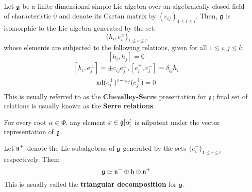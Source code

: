         \begin{theorem}
            Let $\mathfrak{g}$ be a finite-dimensional simple Lie algebra over an algebraically closed field of characteristic $0$ and denote its Cartan matrix by $(c_{ij})_{1 \leq i \leq l}$. Then, $\mathfrak{g}$ is isomorphic to the Lie algebra generated by the set:
                $$\{h_i, e_i^{\pm}\}_{1 \leq i \leq l}$$
            whose elements are subjected to the following relations, given for all $1 \leq i, j \leq l$:
                $$[h_i, h_j] = 0$$
                $$[h_i, e_j^{\pm}] = \pm c_{ij} e_j^{\pm}, [e_i^+, e_j^-] = \delta_{ij} h_i$$
                $$\mathrm{ad}(e_i^{\pm})^{1 - c_{ij}}(e_j^{\pm}) = 0$$
            This is usually referred to as the \textbf{Chevalley-Serre} presentation for $\mathfrak{g}$; final set of relations is usually known as the \textbf{Serre relations}.
        \end{theorem}
        \begin{corollary}
            For every root $\alpha \in \Phi$, any element $x \in \mathfrak{g}[\alpha]$ is nilpotent under the vector representation of $\mathfrak{g}$. 
        \end{corollary}
        \begin{corollary}
            Let $\mathfrak{n}^{\pm}$ denote the Lie subalgebras of $\mathfrak{g}$ generated by the sets $\{e_i^{\pm}\}_{1 \leq i \leq l}$ respectively. Then:
                $$\mathfrak{g} \simeq \mathfrak{n}^- \oplus \mathfrak{h} \oplus \mathfrak{n}^+$$
            This is usually called the \textbf{triangular decomposition} for $\mathfrak{g}$. 
        \end{corollary}

